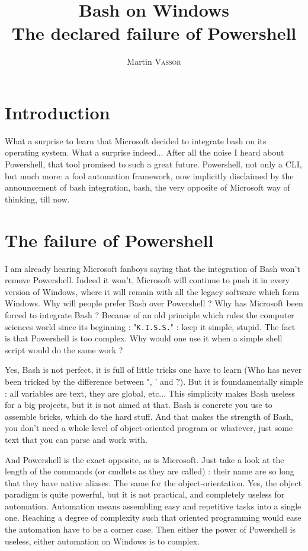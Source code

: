\documentclass{article}
\title{{\huge Bash on Windows}\\ The declared failure of Powershell}
\author{Martin \textsc{Vassor}}
\begin{document}
\maketitle

\section{Introduction}
What a surprise to learn that Microsoft decided to integrate bash on its operating system. What a surprise indeed... After all the noise I heard about Powershell, that tool promised to such a great future. Powershell, not only a CLI, but much more: a fool automation framework, now implicitly disclaimed by the announcement of bash integration, bash, the very opposite of Microsoft way of thinking, till now.

\section{The failure of Powershell}
I am already hearing Microsoft fanboys saying that the integration of Bash won't remove Powershell. Indeed it won't, Microsoft will continue to push it in every version of Windows, where it will remain with all the legacy software which form Windows. Why will people prefer Bash over Powershell ? Why has Microsoft been forced to integrate Bash ? Because of an old principle which rules the computer sciences world since its beginning : "\texttt{K.I.S.S.}" : keep it simple, stupid. The fact is that Powershell is too complex. Why would one use it when a simple shell script would do the same work ?

Yes, Bash is not perfect, it is full of little tricks one have to learn (Who has never been tricked by the difference between ", ' and \` ?). But it is foundamentally simple : all variables are text, they are global, etc... This simplicity makes Bash useless for a big projects, but it is not aimed at that. Bash is concrete you use to assemble bricks, which do the hard stuff. And that makes the strength of Bash, you don't need a whole level of object-oriented program or whatever, just some text that you can parse and work with.

And Powershell is the exact opposite, as is Microsoft. Just take a look at the length of the commands (or cmdlets as they are called) : their name are so long that they have native aliases. The same for the object-orientation. Yes, the object paradigm is quite powerful, but it is not practical, and completely useless for automation. Automation means assembling easy and repetitive tasks into a single one. Reaching a degree of complexity such that oriented programming would ease the automation have to be a corner case. Then either the power of Powershell is useless, either automation on Windows is to complex.
\end{document}
